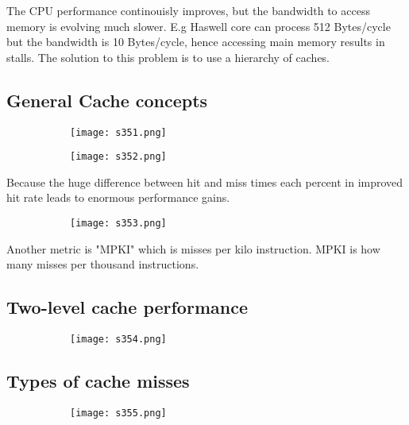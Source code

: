 \documentclass[8pt]{extreport}
\begin{document}
The CPU performance continouisly improves, but the bandwidth to access memory is evolving much slower. E.g Haswell core can process 512 Bytes/cycle but the bandwidth is 10 Bytes/cycle, hence accessing main memory results in stalls. The solution to this problem is to use a hierarchy of caches.

\subsection{General Cache concepts}
\begin{figure}[H]
\begin{subfigure}[b]{0.4\linewidth}
\texttt{[image: s351.png]}
\end{subfigure}
\begin{subfigure}[b]{0.4\linewidth}
\texttt{[image: s352.png]}
\end{subfigure}
\end{figure}
Because the huge difference between hit and miss times each percent in improved hit rate leads to enormous performance gains.
\begin{figure}[H]
\begin{subfigure}[b]{0.4\linewidth}
\texttt{[image: s353.png]}
\end{subfigure}
\end{figure}
Another metric is "MPKI" which is misses per kilo instruction. MPKI is how many misses per thousand instructions.

\subsection{Two-level cache performance}
\begin{figure}[H]
\begin{subfigure}[b]{0.4\linewidth}
\texttt{[image: s354.png]}
\end{subfigure}
\end{figure}

\subsection{Types of cache misses}
\begin{figure}[H]
\begin{subfigure}[b]{0.4\linewidth}
\texttt{[image: s355.png]}
\end{subfigure}
\end{figure}
\end{document}
